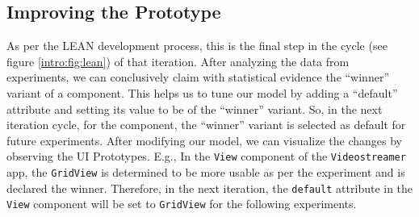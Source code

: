 \subsection{Improving the Prototype}
\label{solutionideas:subsection:improvingprototypes}
As per the LEAN development process, this is the final step in the cycle (see figure \ref{intro:fig:lean}) of that iteration.
After analyzing the data from experiments, we can conclusively claim with statistical evidence the ``winner'' variant of a component.
This helps us to tune our model by adding a ``default'' attribute and setting its value to be of the ``winner'' variant.
So, in the next iteration cycle, for the component, the ``winner'' variant is selected as default for future experiments.
After modifying our model, we can visualize the changes by observing the UI Prototypes.
E.g., In the \texttt{View} component of the \texttt{Videostreamer} app, the \texttt{GridView} is determined to be more usable as per the experiment and is declared the winner. 
Therefore, in the next iteration, the \texttt{default} attribute in the \texttt{View} component will be set to \texttt{GridView} for the following experiments.